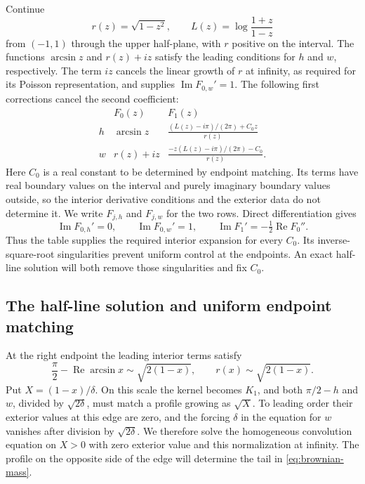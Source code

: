 Continue
\[
 r(z)=\sqrt{1-z^2},\qquad
 L(z)=\log\frac{1+z}{1-z}
\]
from $(-1,1)$ through the upper half-plane, with $r$ positive on the
interval.  The functions $\arcsin z$ and $r(z)+iz$ satisfy the leading
conditions for $h$ and $w$, respectively.  The term $iz$ cancels the
linear growth of $r$ at infinity, as required for its Poisson
representation, and supplies $\operatorname{Im}F_{0,w}'=1$.
The following first corrections cancel the second coefficient:
\begin{equation}
 \begin{array}{c|cc}
   &F_0(z)&F_1(z)\\ \hline
 h&\arcsin z&\displaystyle
                \frac{(L(z)-i\pi)/(2\pi)+C_0z}{r(z)}\\[6pt]
 w&r(z)+iz&\displaystyle
                \frac{-z(L(z)-i\pi)/(2\pi)-C_0}{r(z)}.
 \end{array}
 \label{eq:B6}
\end{equation}
Here $C_0$ is a real constant to be determined by endpoint matching.
Its terms have real boundary values on the interval and purely imaginary
boundary values outside, so the interior derivative conditions and the
exterior data do not determine it.  We write $F_{j,h}$ and $F_{j,w}$ for
the two rows.  Direct differentiation gives
\[
 \operatorname{Im}F_{0,h}'=0,\qquad
 \operatorname{Im}F_{0,w}'=1,\qquad
 \operatorname{Im}F_1'=-\tfrac12\operatorname{Re}F_0''.
\]
Thus the table supplies the required interior expansion for every $C_0$.
Its inverse-square-root singularities prevent uniform control at the
endpoints.  An exact half-line solution will both remove those
singularities and fix $C_0$.

\subsection{The half-line solution and uniform endpoint matching}

At the right endpoint the leading interior terms satisfy
\[
 \frac\pi2-\operatorname{Re}\arcsin x\sim\sqrt{2(1-x)},
 \qquad r(x)\sim\sqrt{2(1-x)}.
\]
Put $X=(1-x)/\delta$.  On this scale the kernel becomes $K_1$, and
both $\pi/2-h$ and $w$, divided by $\sqrt{2\delta}$, must match a
profile growing as $\sqrt X$.  To leading order their exterior values
at this edge are zero, and the forcing $\delta$ in the equation for $w$
vanishes after division by $\sqrt{2\delta}$.  We therefore solve the
homogeneous convolution equation on $X>0$ with zero exterior value and
this normalization at infinity.
The profile on the opposite side of the edge will determine the tail
in \eqref{eq:brownian-mass}.

